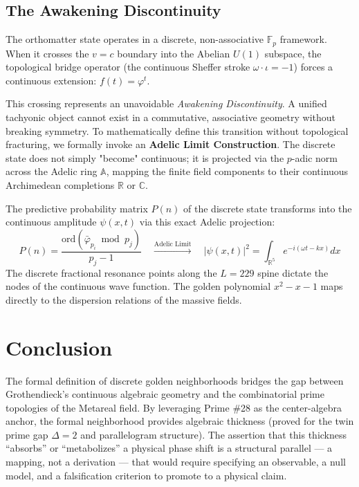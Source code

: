 \subsection{The Awakening Discontinuity}

The orthomatter state operates in a discrete, non-associative $\mathbb{F}_p$ framework. When it crosses the $v=c$ boundary into the Abelian $U(1)$ subspace, the topological bridge operator (the continuous Sheffer stroke $\omega \cdot \iota = -1$) forces a continuous extension: $f(t) = \varphi^t$.

This crossing represents an unavoidable \textit{Awakening Discontinuity}. A unified tachyonic object cannot exist in a commutative, associative geometry without breaking symmetry. To mathematically define this transition without topological fracturing, we formally invoke an \textbf{Adelic Limit Construction}. The discrete state does not simply "become" continuous; it is projected via the $p$-adic norm across the Adelic ring $\mathbb{A}$, mapping the finite field components to their continuous Archimedean completions $\mathbb{R}$ or $\mathbb{C}$.

The predictive probability matrix $P(n)$ of the discrete state transforms into the continuous amplitude $\psi(x,t)$ via this exact Adelic projection:
\begin{equation}
    P(n) = \frac{\mathrm{ord}(\bar\varphi_{p_i} \bmod p_j)}{p_j - 1} \quad \xrightarrow{\text{Adelic Limit}} \quad |\psi(x,t)|^2 = \int_{\mathbb{R}^5} e^{-i(\omega t - k x)} dx
\end{equation}
The discrete fractional resonance points along the $L=229$ spine dictate the nodes of the continuous wave function. The golden polynomial $x^2 - x - 1$ maps directly to the dispersion relations of the massive fields.

\section{Conclusion}
The formal definition of discrete golden neighborhoods bridges the gap between Grothendieck's continuous algebraic geometry and the combinatorial prime topologies of the Metareal field. By leveraging Prime \#28 as the center-algebra anchor, the formal neighborhood provides algebraic thickness (proved for the twin prime gap $\Delta=2$ and parallelogram structure). The assertion that this thickness ``absorbs'' or ``metabolizes'' a physical phase shift is a structural parallel --- a mapping, not a derivation --- that would require specifying an observable, a null model, and a falsification criterion to promote to a physical claim.

